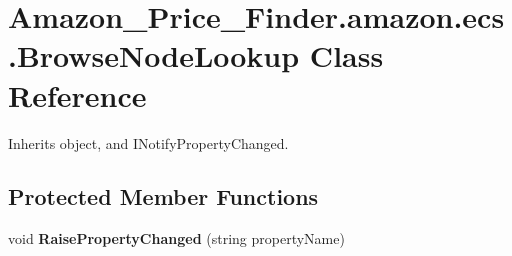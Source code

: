 \hypertarget{class_amazon___price___finder_1_1amazon_1_1ecs_1_1_browse_node_lookup}{\section{Amazon\-\_\-\-Price\-\_\-\-Finder.\-amazon.\-ecs.\-Browse\-Node\-Lookup Class Reference}
\label{class_amazon___price___finder_1_1amazon_1_1ecs_1_1_browse_node_lookup}
}


 




Inherits object, and I\-Notify\-Property\-Changed.

\subsection*{Protected Member Functions}
\begin{DoxyCompactItemize}
\item 
\hypertarget{class_amazon___price___finder_1_1amazon_1_1ecs_1_1_browse_node_lookup_a0f8815670cb4c014e5d475f755ea66a8}{void {\bfseries Raise\-Property\-Changed} (string property\-Name)}\label{class_amazon___price___finder_1_1amazon_1_1ecs_1_1_browse_node_lookup_a0f8815670cb4c014e5d475f755ea66a8}

\end{DoxyCompactItemize}
